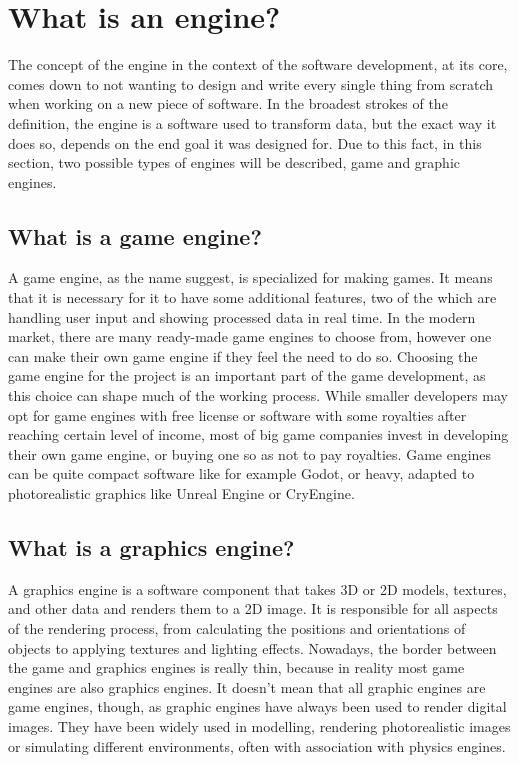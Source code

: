 \newpage
\section{What is an engine?}
\hspace{\parindent}
The concept of the engine in the context of the software development, at its core, comes down to not wanting to design and write every single thing from scratch when working on a new piece of software. In the broadest strokes of the definition, the engine is a software used to transform data, but the exact way it does so, depends on the end goal it was designed for. Due to this fact, in this section, two possible types of engines will be described, game and graphic engines.

\subsection{What is a game engine?}
\hspace{\parindent}
A game engine, as the name suggest, is specialized for making games. It means that it is necessary for it to have some additional features, two of the which are handling user input and showing processed data in real time. In the modern market, there are many ready-made game engines to choose from, however one can make their own game engine if they feel the need to do so. Choosing the game engine for the project is an important part of the game development, as this choice can shape much of the working process. While smaller developers may opt for game engines with free license or software with some royalties after reaching certain level of income, most of big game companies invest in developing their own game engine, or buying one so as not to pay royalties. Game engines can be quite compact software like for example Godot, or heavy, adapted to photorealistic graphics like Unreal Engine or CryEngine.

\subsection{What is a graphics engine?}
\hspace{\parindent}
A graphics engine is a software component that takes 3D or 2D models, textures, and other data and renders them to a 2D image. It is responsible for all aspects of the rendering process, from calculating the positions and orientations of objects to applying textures and lighting effects. Nowadays, the border between the game and graphics engines is really thin, because in reality most game engines are also graphics engines. It doesn't mean that all graphic engines are game engines, though, as graphic engines have always been used to render digital images. They have been widely used in modelling, rendering photorealistic images or simulating different environments, often with association with physics engines. 

